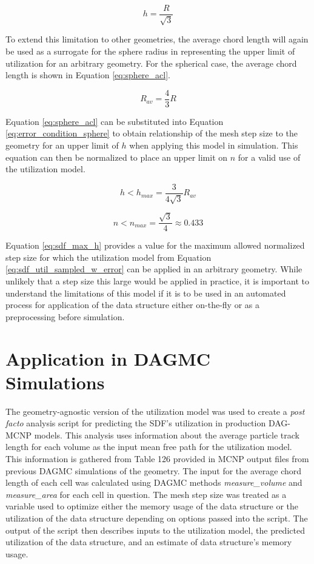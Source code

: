 \begin{equation}
  h = \frac{R}{\sqrt{3}}
  \label{eq:error_condition_sphere}
\end{equation}

To extend this limitation to other geometries, the average chord length will
again be used as a surrogate for the sphere radius in representing the upper
limit of utilization for an arbitrary geometry. For the spherical case, the
average chord length is shown in Equation \eqref{eq:sphere_acl}.

\begin{equation}
  R_{av} = \frac{4}{3}R
  \label{eq:sphere_acl}
\end{equation}

Equation \eqref{eq:sphere_acl} can be substituted into Equation
\eqref{eq:error_condition_sphere} to obtain relationship of the mesh step size to
the geometry for an upper limit of $h$ when applying this model in
simulation. This equation can then be normalized to place an upper limit on $n$
for a valid use of the utilization model.

\begin{equation}
 h < h_{max} = \frac{3}{4\sqrt{3}} R_{av}
\end{equation}

\begin{equation}
 n < n_{max} = \frac{\sqrt{3}}{4} \approx 0.433
\label{eq:sdf_max_h}
\end{equation}

Equation \eqref{eq:sdf_max_h} provides a value for the maximum allowed normalized
step size for which the utilization model from Equation
\eqref{eq:sdf_util_sampled_w_error} can be applied in an arbitrary geometry. While
unlikely that a step size this large would be applied in practice, it is
important to understand the limitations of this model if it is to be used in an
automated process for application of the data structure either on-the-fly or as
a preprocessing before simulation.

\section{Application in DAGMC Simulations}\label{sec:sdf_production}

The geometry-agnostic version of the utilization model was used to create a
\textit{post facto} analysis script for predicting the SDF's utilization in
production DAG-MCNP models. This analysis uses information about the average
particle track length for each volume as the input mean free path for the
utilization model. This information is gathered from Table 126 provided in MCNP
output files from previous DAGMC simulations of the
geometry\cite{LANL_MCNP5_VOLIII}. The input for the average chord length of each
cell was calculated using DAGMC methods \textit{measure\_volume} and
\textit{measure\_area} for each cell in question. The mesh step size was treated
as a variable used to optimize either the memory usage of the data structure or
the utilization of the data structure depending on options passed into the
script. The output of the script then describes inputs to the utilization model,
the predicted utilization of the data structure, and an estimate of data
structure's memory usage.

